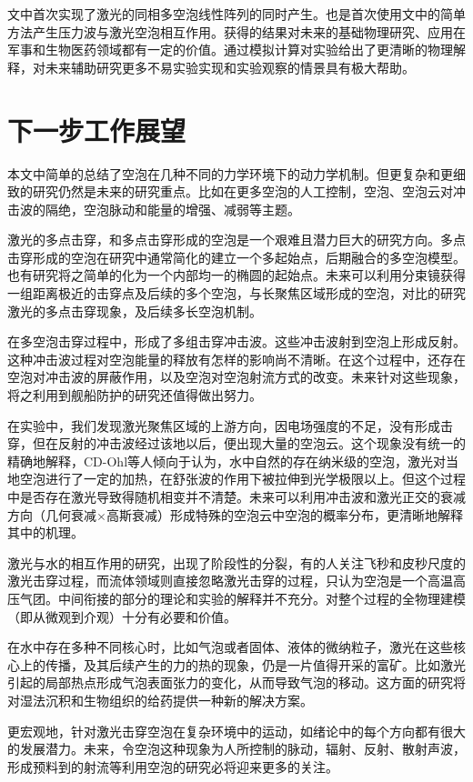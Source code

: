 文中首次实现了激光的同相多空泡线性阵列的同时产生。也是首次使用文中的简单方法产生压力波与激光空泡相互作用。获得的结果对未来的基础物理研究、应用在军事和生物医药领域都有一定的价值。通过模拟计算对实验给出了更清晰的物理解释，对未来辅助研究更多不易实验实现和实验观察的情景具有极大帮助。




\section{下一步工作展望}

本文中简单的总结了空泡在几种不同的力学环境下的动力学机制。但更复杂和更细致的研究仍然是未来的研究重点。比如在更多空泡的人工控制，空泡、空泡云对冲击波的隔绝，空泡脉动和能量的增强、减弱等主题。

激光的多点击穿，和多点击穿形成的空泡是一个艰难且潜力巨大的研究方向。多点击穿形成的空泡在研究中通常简化的建立一个多起始点，后期融合的多空泡模型。也有研究将之简单的化为一个内部均一的椭圆的起始点。未来可以利用分束镜获得一组距离极近的击穿点及后续的多个空泡，与长聚焦区域形成的空泡，对比的研究激光的多点击穿现象，及后续多长空泡机制。

在多空泡击穿过程中，形成了多组击穿冲击波。这些冲击波射到空泡上形成反射。这种冲击波过程对空泡能量的释放有怎样的影响尚不清晰。在这个过程中，还存在空泡对冲击波的屏蔽作用，以及空泡对空泡射流方式的改变。未来针对这些现象，将之利用到舰船防护的研究还值得做出努力。

在实验中，我们发现激光聚焦区域的上游方向，因电场强度的不足，没有形成击穿，但在反射的冲击波经过该地以后，便出现大量的空泡云。这个现象没有统一的精确地解释，CD-Ohl等人倾向于认为，水中自然的存在纳米级的空泡，激光对当地空泡进行了一定的加热，在舒张波的作用下被拉伸到光学极限以上。但这个过程中是否存在激光导致得随机相变并不清楚。未来可以利用冲击波和激光正交的衰减方向（几何衰减$\times$高斯衰减）形成特殊的空泡云中空泡的概率分布，更清晰地解释其中的机理。

激光与水的相互作用的研究，出现了阶段性的分裂，有的人关注飞秒和皮秒尺度的激光击穿过程，而流体领域则直接忽略激光击穿的过程，只认为空泡是一个高温高压气团。中间衔接的部分的理论和实验的解释并不充分。对整个过程的全物理建模（即从微观到介观）十分有必要和价值。

在水中存在多种不同核心时，比如气泡或者固体、液体的微纳粒子，激光在这些核心上的传播，及其后续产生的力的热的现象，仍是一片值得开采的富矿。比如激光引起的局部热点形成气泡表面张力的变化，从而导致气泡的移动。这方面的研究将对湿法沉积和生物组织的给药提供一种新的解决方案。

更宏观地，针对激光击穿空泡在复杂环境中的运动，如绪论中的每个方向都有很大的发展潜力。未来，令空泡这种现象为人所控制的脉动，辐射、反射、散射声波，形成预料到的射流等利用空泡的研究必将迎来更多的关注。

